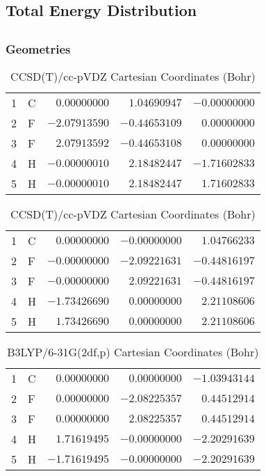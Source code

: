 \documentclass[10pt,oneside]{article}
\begin{document}
\begin{table}
\subsection*{Total Energy Distribution}
\centering\end{table}

\clearpage

\subsection{}

\begin{table}[h!]
\subsubsection*{Geometries}
\begin{multicols}{2}
\centering
\caption{CCSD(T)/cc-pVTZ Cartesian Coordinates (Bohr)}
\begin{tabular}{llrrr}
\toprule
1  & C  & $ 0.00000000$ & $ 1.04690947$ & $-0.00000000$ \\
2  & F  & $-2.07913590$ & $-0.44653109$ & $ 0.00000000$ \\
3  & F  & $ 2.07913592$ & $-0.44653108$ & $ 0.00000000$ \\
4  & H  & $-0.00000010$ & $ 2.18482447$ & $-1.71602833$ \\
5  & H  & $-0.00000010$ & $ 2.18482447$ & $ 1.71602833$ \\
\bottomrule
\end{tabular}
\caption{CCSD(T)/cc-pVDZ Cartesian Coordinates (Bohr)}
\begin{tabular}{llrrr}
\toprule
1  & C  & $ 0.00000000$ & $-0.00000000$ & $ 1.04766233$ \\
2  & F  & $-0.00000000$ & $-2.09221631$ & $-0.44816197$ \\
3  & F  & $-0.00000000$ & $ 2.09221631$ & $-0.44816197$ \\
4  & H  & $-1.73426690$ & $ 0.00000000$ & $ 2.21108606$ \\
5  & H  & $ 1.73426690$ & $ 0.00000000$ & $ 2.21108606$ \\
\bottomrule
\end{tabular}
\end{multicols}
\end{table}

\begin{table}[h]
\centering
\caption{B3LYP/6-31G(2df,p) Cartesian Coordinates (Bohr)}
\begin{tabular}{llrrr}
\toprule
1  & C  & $ 0.00000000$ & $ 0.00000000$ & $-1.03943144$ \\
2  & F  & $ 0.00000000$ & $-2.08225357$ & $ 0.44512914$ \\
3  & F  & $ 0.00000000$ & $ 2.08225357$ & $ 0.44512914$ \\
4  & H  & $ 1.71619495$ & $-0.00000000$ & $-2.20291639$ \\
5  & H  & $-1.71619495$ & $-0.00000000$ & $-2.20291639$ \\
\bottomrule
\end{tabular}
\end{table}
\end{document}
